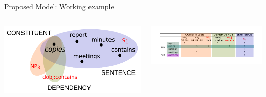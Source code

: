 \documentclass[10pt,xcolor=table]{beamer}
\begin{document}
\begin{frame}{Proposed Model: Working example}

	\begin{columns}
	\begin{minipage}[c][0.4\textheight][c]{\linewidth}
	  \centering
	  \includegraphics[width=.6\linewidth]{img/hypergraph_copies.pdf}
	\end{minipage}
	\begin{minipage}[c][0.5\textheight][c]{\linewidth}
		\centering
		\includegraphics[width=.9\linewidth]{img/incidence_aug.pdf}
	\end{minipage}
	\end{columns}
\end{frame}
\end{document}
